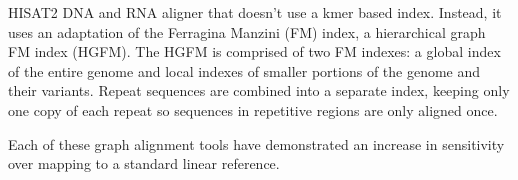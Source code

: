 
HISAT2 DNA and RNA aligner that doesn't use a kmer based index.
Instead, it uses an adaptation of the Ferragina Manzini (FM) index, a hierarchical graph FM index (HGFM).
The HGFM is comprised of two FM indexes: a global index of the entire genome and local indexes of smaller portions of the genome and their variants.
Repeat sequences are combined into a separate index, keeping only one copy of each repeat so sequences in repetitive regions are only aligned once.
 

Each of these graph alignment tools have demonstrated an increase in sensitivity over mapping to a standard linear reference.


